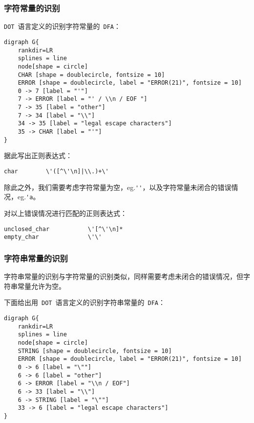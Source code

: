 \documentclass[lang=cn,11pt,a4paper]{paper}
\begin{document}
\subsubsection{字符常量的识别}

\lstinline{DOT}\ 语言定义的识别字符常量的\ \lstinline{DFA}：

\begin{lstlisting}
digraph G{
    rankdir=LR
    splines = line
    node[shape = circle]
    CHAR [shape = doublecircle, fontsize = 10]
    ERROR [shape = doublecircle, label = "ERROR(21)", fontsize = 10]
    0 -> 7 [label = "'"]
    7 -> ERROR [label = "' / \\n / EOF "]
    7 -> 35 [label = "other"]
    7 -> 34 [label = "\\"]
    34 -> 35 [label = "legal escape characters"]
    35 -> CHAR [label = "'"]
}
\end{lstlisting}

据此写出正则表达式：

\begin{lstlisting}
char 		\'([^\'\n]|\\.)+\'
\end{lstlisting}

除此之外，我们需要考虑字符常量为空，eg.\lstinline{''}，以及字符常量未闭合的错误情况，eg.\lstinline{'a}。

对以上错误情况进行匹配的正则表达式：

\begin{lstlisting}
unclosed_char			\'[^\'\n]*
empty_char				\'\'
\end{lstlisting}

\subsubsection{字符串常量的识别}

字符串常量的识别与字符常量的识别类似，同样需要考虑未闭合的错误情况，但字符串常量允许为空。

下面给出用\ \lstinline{DOT}\ 语言定义的识别字符串常量的\ \lstinline{DFA}：

\begin{lstlisting}
digraph G{
    rankdir=LR
    splines = line
    node[shape = circle]
    STRING [shape = doublecircle, fontsize = 10]
    ERROR [shape = doublecircle, label = "ERROR(21)", fontsize = 10]
    0 -> 6 [label = "\""]
    6 -> 6 [label = "other"]
    6 -> ERROR [label = "\\n / EOF"]
    6 -> 33 [label = "\\"]
    6 -> STRING [label = "\""]
    33 -> 6 [label = "legal escape characters"]
}
\end{lstlisting}
\end{document}
